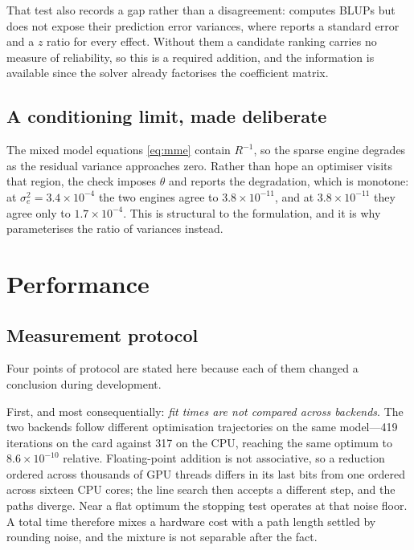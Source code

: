 \documentclass[article]{jss}
\begin{document}
That test also records a gap rather than a disagreement:  computes
BLUPs but does not expose their prediction error variances, where
 reports a standard error and a $z$ ratio for every effect.
Without them a candidate ranking carries no measure of reliability, so this is
a required addition, and the information is available since the solver already
factorises the coefficient matrix.

\subsection{A conditioning limit, made deliberate}

The mixed model equations \eqref{eq:mme} contain $R^{-1}$, so the sparse
engine degrades as the residual variance approaches zero. Rather than hope an
optimiser visits that region, the check imposes $\theta$ and reports the
degradation, which is monotone: at $\sigma_e^2 = 3.4 \times 10^{-4}$ the two
engines agree to $3.8 \times 10^{-11}$, and at $3.8 \times 10^{-11}$ they
agree only to $1.7 \times 10^{-4}$. This is structural to the formulation,
and it is why  parameterises the ratio of variances instead.

\section{Performance}\label{sec:performance}

\subsection{Measurement protocol}\label{sec:protocol}

Four points of protocol are stated here because each of them changed a
conclusion during development.

First, and most consequentially: \emph{fit times are not compared across
backends}. The two backends follow different optimisation trajectories on the
same model---419 iterations on the card against 317 on the CPU, reaching the
same optimum to $8.6 \times 10^{-10}$ relative. Floating-point addition is not
associative, so a reduction ordered across thousands of GPU threads differs in
its last bits from one ordered across sixteen CPU cores; the line search then
accepts a different step, and the paths diverge. Near a flat optimum the
stopping test operates at that noise floor. A total time therefore mixes a
hardware cost with a path length settled by rounding noise, and the mixture is
not separable after the fact.
\end{document}
